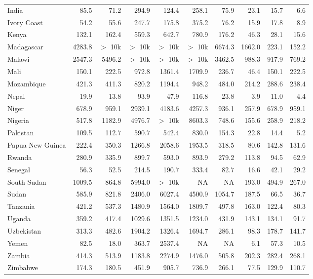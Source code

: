 \begin{table}[b]
{\begin{tabular}[t]{lrrrrrrrrr}
India & 85.5 & 71.2 & 294.9 & 124.4 & 258.1 & 75.9 & 23.1 & 15.7 & 6.6\\
Ivory Coast & 54.2 & 55.6 & 247.7 & 175.8 & 375.2 & 76.2 & 15.9 & 17.8 & 8.9\\
Kenya & 132.1 & 162.4 & 559.3 & 642.7 & 780.9 & 176.2 & 46.3 & 28.1 & 15.6\\
Madagascar & 4283.8 & $>$ 10k & $>$ 10k & $>$ 10k & $>$ 10k & 6674.3 & 1662.0 & 223.1 & 152.2\\
Malawi & 2547.3 & 5496.2 & $>$ 10k & $>$ 10k & $>$ 10k & 3462.5 & 988.3 & 917.9 & 769.2\\
Mali & 150.1 & 222.5 & 972.8 & 1361.4 & 1709.9 & 236.7 & 46.4 & 150.1 & 222.5\\
Mozambique & 421.3 & 411.3 & 820.2 & 1194.4 & 948.2 & 484.0 & 214.2 & 288.6 & 238.4\\
Nepal & 19.9 & 13.8 & 93.9 & 47.9 & 116.8 & 23.8 & 3.9 & 11.0 & 4.4\\
Niger & 678.9 & 959.1 & 2939.1 & 4183.6 & 4257.3 & 936.1 & 257.9 & 678.9 & 959.1\\
Nigeria & 517.8 & 1182.9 & 4976.7 & $>$ 10k & 8603.3 & 748.6 & 155.6 & 258.9 & 218.2\\
Pakistan & 109.5 & 112.7 & 590.7 & 542.4 & 830.0 & 154.3 & 22.8 & 14.4 & 5.2\\
Papua New Guinea & 222.4 & 350.3 & 1266.8 & 2058.6 & 1953.5 & 318.5 & 80.6 & 142.8 & 131.6\\
Rwanda & 280.9 & 335.9 & 899.7 & 593.0 & 893.9 & 279.2 & 113.8 & 94.5 & 62.9\\
Senegal & 56.3 & 52.5 & 214.5 & 190.7 & 333.4 & 82.7 & 16.6 & 42.1 & 29.2\\
South Sudan & 1009.5 & 864.8 & 5994.0 & $>$ 10k & NA & NA & 193.0 & 494.9 & 267.0\\
Sudan & 585.9 & 821.8 & 2406.0 & 6027.4 & 4500.9 & 1054.7 & 187.5 & 66.5 & 36.7\\
Tanzania & 421.2 & 537.3 & 1480.9 & 1564.0 & 1809.7 & 497.8 & 163.0 & 122.4 & 80.3\\
Uganda & 359.2 & 417.4 & 1029.6 & 1351.5 & 1234.0 & 431.9 & 143.1 & 134.1 & 91.7\\
Uzbekistan & 313.3 & 482.6 & 1904.2 & 1326.4 & 1694.7 & 286.1 & 98.3 & 178.7 & 141.7\\
Yemen & 82.5 & 18.0 & 363.7 & 2537.4 & NA & NA & 6.1 & 57.3 & 10.5\\
Zambia & 414.3 & 513.9 & 1183.8 & 2274.9 & 1476.0 & 505.8 & 202.3 & 282.4 & 268.1\\
Zimbabwe & 174.3 & 180.5 & 451.9 & 905.7 & 736.9 & 266.1 & 77.5 & 129.9 & 110.7\\
\bottomrule
\end{tabular}}
\end{table}